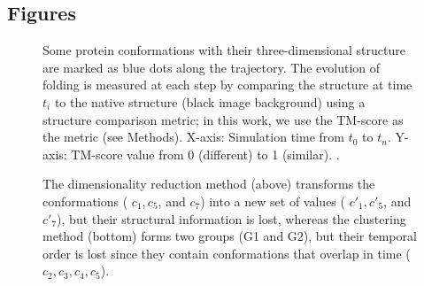\documentclass[twocolumn]{bmcart}%
\begin{document}
\begin{backmatter}




\section*{Figures}

\begin{figure}[th]
\caption{ Some protein conformations with their three-dimensional structure are marked as blue dots along the trajectory. The evolution of folding is measured at each step by comparing the structure at time $t_{i}$ to the native structure (black image background) using a structure comparison metric; in this work, we use the TM-score as the metric (see Methods). X-axis: Simulation time from $t_{0}$ to $t_{n}$. Y-axis: TM-score value from 0 (different) to 1 (similar). \label{fig:Folding-Trajectory}. }
\end{figure}

\begin{figure}[th]
\caption{ The dimensionality reduction method (above) transforms the conformations ( $c_{1},c_{5}$, and $c_{7}$) into a new set of values ( $c'_{1},c'_{5}$, and $c'_{7}$), but their structural information is lost, whereas the clustering method (bottom) forms two groups (G1 and G2), but their temporal order is lost since they contain conformations that overlap in time ($c_{2},c_{3},c_{4},c_{5}$). \label{fig:lost-info-dimensionality}}
\end{figure}


\end{backmatter}
\end{document}
